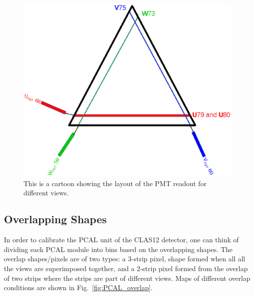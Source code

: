 \begin{figure}[h]
    \centering
    \includegraphics[width= 4.5in, keepaspectratio = true]{PMTreadout}
    \caption{This is a cartoon showing the layout of the PMT readout for different views.}
    \label{fig:PMTreadout}
\end{figure}
\FloatBarrier

\FloatBarrier
\subsection{Overlapping Shapes}
In order to calibrate the PCAL unit of the CLAS12 detector, one can think of dividing each PCAL module into bins based on the 
overlapping shapes. The overlap shapes/pixels are of two types: a 3-strip pixel, shape formed when all 
all the views are superimposed together, and a 2-strip pixel formed from the overlap of two strips where the strips are
part of different views. Maps of different overlap conditions are shown in Fig.~\ref{fig:PCAL_overlap}.


